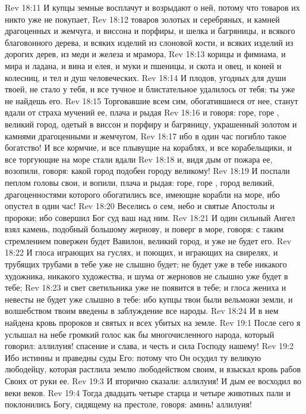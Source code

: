 \vs Rev 18:11 И купцы земные восплачут и возрыдают о ней, потому что товаров их никто уже не покупает,
\vs Rev 18:12 товаров золотых и серебряных, и камней драгоценных и жемчуга, и виссона и порфиры, и шелка и багряницы, и всякого благовонного дерева, и всяких изделий из слоновой кости, и всяких изделий из дорогих дерев, из меди и железа и мрамора,
\vs Rev 18:13 корицы и фимиама, и мира и ладана, и вина и елея, и муки и пшеницы, и скота и овец, и коней и колесниц, и тел и душ человеческих.
\vs Rev 18:14 И плодов, угодных для души твоей, не стало у тебя, и все тучное и блистательное удалилось от тебя; ты уже не найдешь его.
\vs Rev 18:15 Торговавшие всем сим, обогатившиеся от нее, станут вдали от страха мучений ее, плача и рыдая
\vs Rev 18:16 и говоря: горе, горе , великий город, одетый в виссон и порфиру и багряницу, украшенный золотом и камнями драгоценными и жемчугом,
\vs Rev 18:17 ибо в один час погибло такое богатство! И все кормчие, и все плывущие на кораблях, и все корабельщики, и все торгующие на море стали вдали
\vs Rev 18:18 и, видя дым от пожара ее, возопили, говоря: какой город подобен городу великому!
\vs Rev 18:19 И поспали пеплом головы свои, и вопили, плача и рыдая: горе, горе , город великий, драгоценностями которого обогатились все, имеющие корабли на море, ибо опустел в один час!
\vs Rev 18:20 Веселись о сем, небо и святые Апостолы и пророки; ибо совершил Бог суд ваш над ним.
\rsbpar\vs Rev 18:21 И один сильный Ангел взял камень, подобный большому жернову, и поверг в море, говоря: с таким стремлением повержен будет Вавилон, великий город, и уже не будет его.
\vs Rev 18:22 И глоса играющих на гуслях, и поющих, и играющих на свирелях, и трубящих трубами в тебе уже не слышно будет; не будет уже в тебе никакого художника, никакого художества, и шума от жерновов не слышно уже будет в тебе;
\vs Rev 18:23 и свет светильника уже не появится в тебе; и глоса жениха и невесты не будет уже слышно в тебе: ибо купцы твои были вельможи земли, и волшебством твоим введены в заблуждение все народы.
\vs Rev 18:24 И в нем найдена кровь пророков и святых и всех убитых на земле.
\vs Rev 19:1 После сего я услышал на небе громкий голос как бы многочисленного народа, который говорил: аллилуия! спасение и слава, и честь и сила Господу нашему!
\vs Rev 19:2 Ибо истинны и праведны суды Его: потому что Он осудил ту великую любодейцу, которая растлила землю любодейством своим, и взыскал кровь рабов Своих от руки ее.
\vs Rev 19:3 И вторично сказали: аллилуия! И дым ее восходил во веки веков.
\vs Rev 19:4 Тогда двадцать четыре старца и четыре животных пали и поклонились Богу, сидящему на престоле, говоря: аминь! аллилуия!
